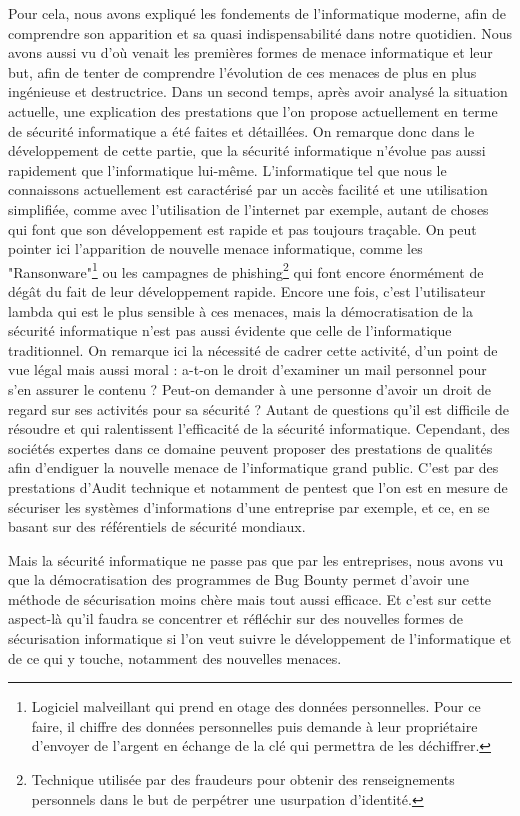 \documentclass[a4paper]{memoir}
\begin{document}
Pour cela, nous avons expliqué les fondements de l'informatique moderne, afin de comprendre son apparition et sa quasi indispensabilité dans notre quotidien. Nous avons aussi vu d'où venait les premières formes de menace informatique et leur but, afin de tenter de comprendre l'évolution de ces menaces de plus en plus ingénieuse et destructrice.
Dans un second temps, après avoir analysé la situation actuelle, une explication des prestations que l'on propose actuellement en terme de sécurité informatique a été faites et détaillées. 
On remarque donc dans le développement de cette partie, que la sécurité informatique n'évolue pas aussi rapidement que l'informatique lui-même. L'informatique tel que nous le connaissons actuellement est caractérisé par un accès facilité et une utilisation simplifiée, comme avec l'utilisation de l'internet par exemple, autant de choses qui font que son développement est rapide et pas toujours traçable. On peut pointer ici l'apparition de nouvelle menace informatique, comme les "Ransonware"\footnote{Logiciel malveillant qui prend en otage des données personnelles. Pour ce faire, il chiffre des données personnelles puis demande à leur propriétaire d'envoyer de l'argent en échange de la clé qui permettra de les déchiffrer.} ou les campagnes de phishing\footnote{Technique utilisée par des fraudeurs pour obtenir des renseignements personnels dans le but de perpétrer une usurpation d'identité. } qui font encore énormément de dégât du fait de leur développement rapide. 
Encore une fois, c'est l'utilisateur lambda qui est le plus sensible à ces menaces, mais la démocratisation de la sécurité informatique n'est pas aussi évidente que celle de l'informatique traditionnel. On remarque ici la nécessité de cadrer cette activité, d'un point de vue légal mais aussi moral : a-t-on le droit d'examiner un mail personnel pour s'en assurer le contenu ? Peut-on demander à une personne d'avoir un droit de regard sur ses activités pour sa sécurité ? Autant de questions qu'il est difficile de résoudre et qui ralentissent l'efficacité de la sécurité informatique.
Cependant, des sociétés expertes dans ce domaine peuvent proposer des prestations de qualités afin d'endiguer la nouvelle menace de l'informatique grand public. C'est par des prestations d'Audit technique et notamment de pentest que l'on est en mesure de sécuriser les systèmes d'informations d'une entreprise par exemple, et ce, en se basant sur des référentiels de sécurité mondiaux.

Mais la sécurité informatique ne passe pas que par les entreprises, nous avons vu que la démocratisation des programmes de Bug Bounty permet d'avoir une méthode de sécurisation moins chère mais tout aussi efficace. Et c'est sur cette aspect-là qu'il faudra se concentrer et réfléchir sur des nouvelles formes de sécurisation informatique si l'on veut suivre le développement de l'informatique et de ce qui y touche, notamment des nouvelles menaces.
\end{document}
